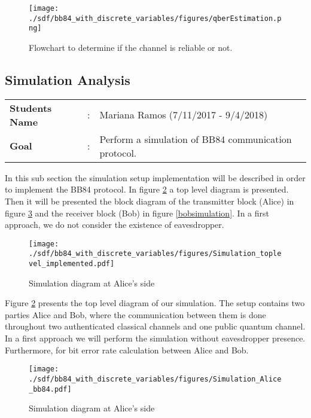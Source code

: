 \begin{refsection}
	
\begin{figure}[H]
	\centering
	\texttt{[image: ./sdf/bb84\_with\_discrete\_variables/figures/qberEstimation.png]}
	\caption{Flowchart to determine if the channel is reliable or not.}\label{fig:flowQber}
\end{figure}



\newpage

\subsection{Simulation Analysis}

\begin{tcolorbox}	
\begin{tabular}{p{2.75cm} p{0.2cm} p{10.5cm}} 	
\textbf{Students Name}  &:& Mariana Ramos (7/11/2017 - 9/4/2018) \\
\textbf{Goal}          &:& Perform a simulation of BB84 communication protocol.
\end{tabular}
\end{tcolorbox}

In this sub section the simulation setup implementation will be described in order to implement the BB84 protocol. In figure \ref{simulationimplemented} a top level diagram is presented. Then it will be presented the block diagram of the transmitter block (Alice) in figure \ref{alicesimulation} and the receiver block (Bob) in figure \ref{bobsimulation}. In a first approach, we do not consider the existence of eavesdropper.

\begin{figure}[H]
    \centering
        \texttt{[image: ./sdf/bb84\_with\_discrete\_variables/figures/Simulation\_toplevel\_implemented.pdf]}
    \caption{Simulation diagram at Alice's side}\label{simulationimplemented}
\end{figure}


Figure \ref{simulationimplemented} presents the top level diagram of our simulation. The setup contains two parties Alice and Bob, where the communication between them is done throughout two authenticated classical channels and one public quantum channel. In a first approach we will perform the simulation without eavesdropper presence. Furthermore, for bit error rate calculation between Alice and Bob.

\begin{figure}[h]
    \centering
        \texttt{[image: ./sdf/bb84\_with\_discrete\_variables/figures/Simulation\_Alice\_bb84.pdf]}
    \caption{Simulation diagram at Alice's side}\label{alicesimulation}
\end{figure}



\end{refsection}
